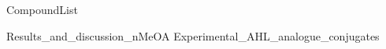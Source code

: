 \documentclass[10pt,a4paper]{article}
\begin{document}
	

{CompoundList}





{Results_and_discussion_nMeOA}
\newpage
{Experimental_AHL_analogue_conjugates}

\newpage
{}


\listoftodos
\end{document}
